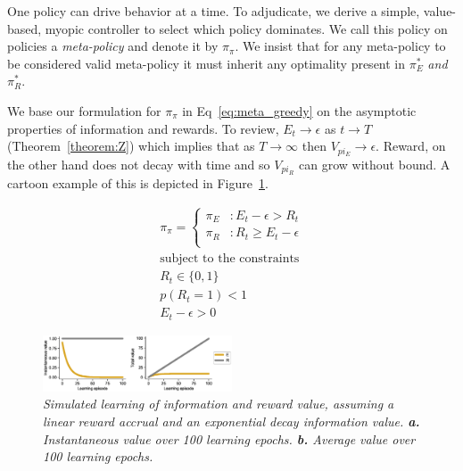 \documentclass[9pt,twocolumn,twoside]{pnas-new}
\begin{document}
One policy can drive behavior at a time. To adjudicate, we derive a simple, value-based, myopic controller \cite{Hocker2017} to select which policy dominates. We call this policy on policies a \textit{meta-policy} and denote it by $\pi_{\pi}$. We insist that for any meta-policy to be considered valid meta-policy it must inherit any optimality present in $\pi^*_E$ \textit{and} $\pi^*_R$.

We base our formulation for $\pi_{\pi}$ in Eq~\ref{eq:meta_greedy} on the asymptotic properties of information and rewards. To review, $E_t \rightarrow \epsilon$ as $t \rightarrow T$ (Theorem~\ref{theorem:Z}) which implies that as $T \rightarrow \infty$ then $V_{pi_E} \rightarrow \epsilon$. Reward, on the other hand does not decay with time and so $V_{pi_R}$ can grow without bound. A cartoon example of this is depicted in Figure~\ref{fig:simple_E_R_timecourse}.

\begin{equation} \label{eq:meta_greedy}
    \begin{split}
        \pi_{\pi} = 
        \begin{cases}
            \pi_E & : E_t - \epsilon > R_t \\
            \pi_R & : R_t \geq E_t - \epsilon \\
        \end{cases}\\
        \text{subject to the constraints}\\
        R_t \in \{0, 1\}\\ 
        p(R_t = 1) < 1\\
        E_t - \epsilon > 0
    \end{split}
\end{equation}

\begin{figure}
\includegraphics[width=0.5\textwidth]{figures/simple_E_R_timecourse.eps}
\caption{
    \textit{Simulated learning of information and reward value, assuming a linear reward accrual and an exponential decay information value. 
    \textbf{a.} Instantaneous value over 100 learning epochs.  
    \textbf{b.} Average value over 100 learning epochs.}
}
\label{fig:simple_E_R_timecourse}
\end{figure}
\end{document}
